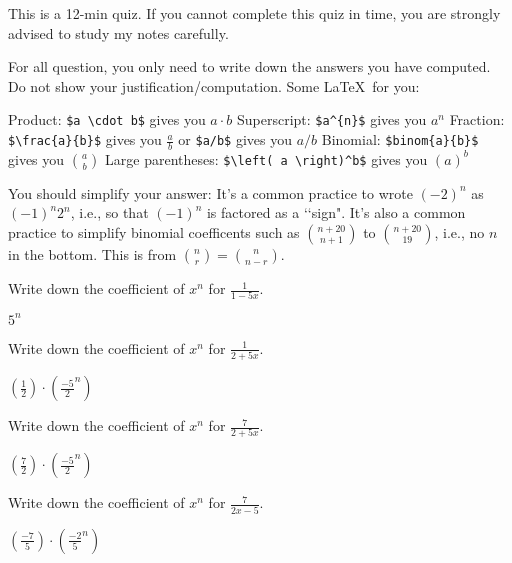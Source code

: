 

\renewcommand\AUTHOR{nweadick1@cougars.ccis.edu} %


\topmattertwo

This is a 12-min quiz.
If you cannot complete this quiz in time, you are strongly
advised to study my notes carefully.

For all question, you only need to write down the answers you have
computed. Do not show your justification/computation.
Some \LaTeX\ for you:
\begin{enumerate}[nosep]
\li Product: \verb!$a \cdot b$! gives you $a \cdot b$
\li Superscript: \verb!$a^{n}$! gives you $a^{n}$
\li Fraction: \verb!$\frac{a}{b}$! gives you $\frac{a}{b}$ or
\verb!$a/b$! gives you $a/b$ 
\li Binomial: \verb!$binom{a}{b}$! gives you $\binom{a}{b}$
\li Large parentheses:
\verb!$\left( a \right)^b$! gives you $\left( a \right)^b$ 
\end{enumerate}
You should simplify your answer:
It's a common practice to wrote $(-2)^n$ as $(-1)^n 2^n$, i.e.,
so that $(-1)^n$ is factored as a \lq\lq sign".
It's also a common practice to simplify binomial coefficents
such as $\binom{n + 20}{n + 1}$ to
$\binom{n + 20}{19}$,
i.e., no $n$ in the bottom.
This is from $\binom{n}{r} = \binom{n}{n - r}$.

\nextq
Write down the coefficient of $x^n$ for 
$\displaystyle\frac{1}{1 - 5x}$.
\\
\ANSWER
\begin{answerlong}
$5^n$
\end{answerlong}

\nextq
Write down the coefficient of $x^n$ for 
$\displaystyle\frac{1}{2 + 5x}$.
\\
\ANSWER
\begin{answerlong}
$ (\frac{1}{2}) \cdot (\frac{-5}{2}^n)$
\end{answerlong}

\nextq
Write down the coefficient of $x^n$ for 
$\displaystyle\frac{7}{2 + 5x}$.
\\
\ANSWER
\begin{answerlong}
$ (\frac{7}{2})\cdot(\frac{-5}{2}^n)$
\end{answerlong}

\nextq
Write down the coefficient of $x^n$ for 
$\displaystyle\frac{7}{2x - 5}$.
\\
\ANSWER
\begin{answerlong}
$ (\frac{-7}{5}) \cdot (\frac{-2}{5}^n)$
\end{answerlong}

